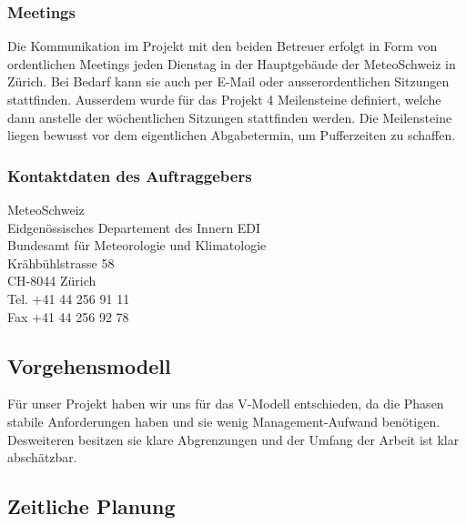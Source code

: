 \documentclass[a4paper,10pt]{article}
\begin{document}
\subsubsection{Meetings}
Die Kommunikation im Projekt mit den beiden Betreuer erfolgt in Form von ordentlichen Meetings jeden Dienstag in der Hauptgebäude der MeteoSchweiz in Zürich. Bei Bedarf kann sie auch per E-Mail oder ausserordentlichen Sitzungen stattfinden. Ausserdem wurde für das Projekt 4 Meilensteine definiert, welche dann anstelle der wöchentlichen Sitzungen stattfinden werden. Die Meilensteine liegen bewusst vor dem eigentlichen Abgabetermin, um Pufferzeiten zu schaffen.

\subsubsection{Kontaktdaten des Auftraggebers}
MeteoSchweiz\\
Eidgenössisches Departement des Innern EDI \\
Bundesamt für Meteorologie und Klimatologie\\
Krähbühlstrasse 58\\
CH-8044 Zürich\\
Tel.   +41 44 256 91 11 \\
Fax   +41 44 256 92 78\\

\subsection{Vorgehensmodell}
Für unser Projekt haben wir uns für das V-Modell entschieden, da die
Phasen stabile Anforderungen haben und sie wenig Management-Aufwand
benötigen. Desweiteren besitzen sie klare Abgrenzungen und der Umfang
der Arbeit ist klar abschätzbar. 

\subsection{Zeitliche Planung}
\end{document}

